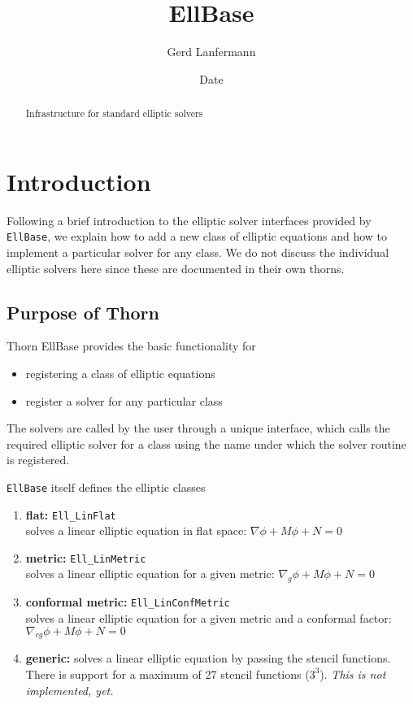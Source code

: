 \documentclass{article}
\begin{document}
\title{EllBase}
\author{Gerd Lanfermann}
\date{$ $Date$ $}

\maketitle


\begin{abstract}
Infrastructure for standard elliptic solvers
\end{abstract}


\section{Introduction}
Following a brief introduction to the elliptic solver interfaces
provided by {\tt EllBase}, we explain how to add a 
new class of elliptic equations and how to implement a particular solver 
for any class.
We do not discuss the individual elliptic solvers here since these are
documented in their own thorns.

\subsection{Purpose of Thorn}

Thorn EllBase provides the basic functionality for 
\begin{itemize}
\item registering a class of elliptic equations
\item register a solver for any particular class
\end{itemize}

The solvers are called by the user through a unique interface, which calls the 
required elliptic solver for a class using the name under which the solver 
routine is  registered. 

{\tt EllBase} itself defines the elliptic classes
\begin{enumerate}
\item{\bf flat:} {\tt Ell\_LinFlat}\\
solves a linear elliptic equation in flat space: $\nabla \phi + M \phi
+N = 0 $

\item{\bf metric:} {\tt Ell\_LinMetric}\\
solves a linear elliptic equation for a given metric: $\nabla_{g} \phi
+ M \phi + N = 0 $
\item{\bf conformal metric:} {\tt Ell\_LinConfMetric}\\
 solves a linear elliptic equation for a
given metric and a conformal factor: $\nabla_{cg} \phi + M \phi
+ N = 0 $
\item{\bf generic:} solves a linear elliptic equation by passing the 
	stencil functions. There is support for a maximum of 27 stencil 
	functions ($3^3$). {\em This is not implemented, yet.}
\end{enumerate}
\end{document}

